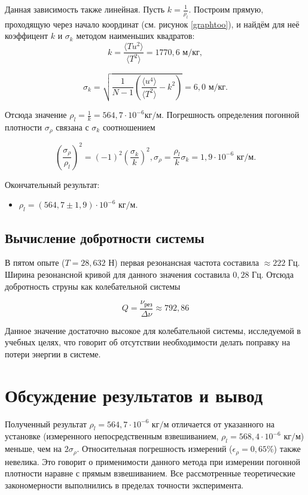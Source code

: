 \documentclass[a4paper,12pt]{article} %
\begin{document}
Данная зависимость также линейная. Пусть $ k = \frac{1}{\rho_l} $. Построим прямую, проходящую через начало координат (см. рисунок \ref{graphtoo}), и  найдём для неё коэффицент $ k $ и $ \sigma_k $ методом наименьших квадратов: 
\begin{equation}
    k = \frac{\langle T u^2 \rangle}{\langle T^2 \rangle} = 1770,6 \text{ м/кг},
\end{equation}

\begin{equation}
    \sigma_k = \sqrt{\frac{1}{N - 1}(\frac{\langle u^4 \rangle}{\langle T^2 \rangle} - k^2)} = 6,0 \text{ м/кг}.
\end{equation}

Отсюда значение $ \rho_l = \frac{1}{k} = 564,7 \cdot 10^{-6} \text{кг/м}$. Погрешность определения погонной плотности $ \sigma_\rho $ связана с $ \sigma_k $ соотношением 

\begin{equation}
    (\frac{\sigma_\rho}{\rho_l})^2 = (-1)^2 (\frac{\sigma_k}{k})^2, \sigma_\rho = \frac{\rho_l}{k} \sigma_k = 1,9 \cdot 10^{-6} \text{ кг/м}.
\end{equation}

Окончательный результат:

\begin{itemize}
    \item $ \rho_l = (564,7 \pm 1,9)\cdot 10^{-6} \text{ кг/м}$.
\end{itemize}

\subsection{Вычисление добротности системы}

В пятом опыте ($ T = 28,632 $ Н) первая резонансная частота составила $ \approx 222$ Гц. Ширина резонансной кривой для данного значения составила $ 0,28 $ Гц. Отсюда добротность струны как колебательной системы

\begin{equation}
    Q = \frac{\nu_\text{рез}}{\Delta \nu} \approx 792,86
\end{equation}

Данное значение достаточно высокое для колебательной системы, исследуемой в учебных целях, что говорит об отсутствии необходимости делать поправку на потери энергии в системе.

\section {Обсуждение результатов и вывод}

Полученный результат $ \rho_l = 564,7 \cdot 10^{-6} \text{ кг/м}$ отличается от указанного на установке (измеренного непосредственным взвешиванием, $ \rho_l = 568,4 \cdot 10^{-6} \text{ кг/м}$) меньше, чем на $ 2\sigma_\rho $. Относительная погрешность измерений ($ \epsilon_\rho = 0,65 \% $) также невелика. Это говорит о применимости данного метода при измерении погонной плотности наравне с прямым взвешиванием. Все рассмотренные теоретические закономерности выполнились в пределах точности эксперимента. 
\end{document}
